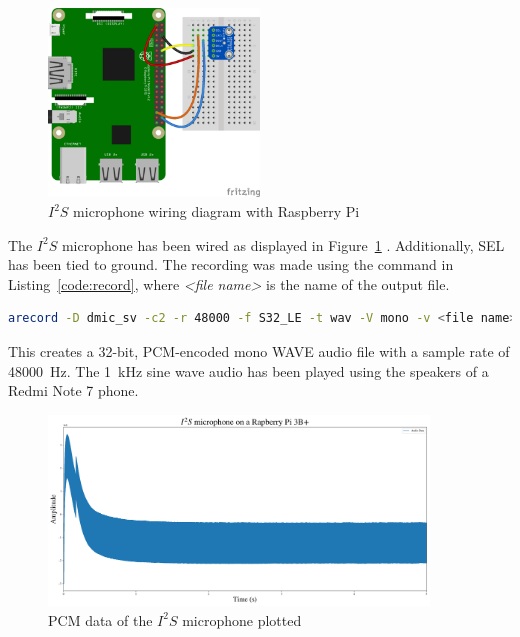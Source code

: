 \begin{figure}[H]
    \centering
    \includegraphics[width=0.5\textwidth]{figures/i2s/wiring_pi.png}
    \caption[$I^2S$ microphone wiring diagram with Raspberry Pi \cite{i2s_wiring}]{$I^2S$ microphone wiring diagram with Raspberry Pi}
    \label{fig:i2s_wiring}
\end{figure}

The $I^2S$ microphone has been wired as displayed in Figure~\ref{fig:i2s_wiring} \cite{i2s_wiring}.
Additionally, SEL has been tied to ground.
The recording was made using the command in Listing~\ref{code:record},
where \emph{<file name>} is the name of the output file.

\begin{minipage}{\textwidth}
\begin{lstlisting}[style=colorEX,language=bash,caption={Recording Command},label={code:record}]
arecord -D dmic_sv -c2 -r 48000 -f S32_LE -t wav -V mono -v <file name>
\end{lstlisting}
\end{minipage}

This creates a 32-bit, PCM-encoded mono WAVE audio file with a sample rate of \SI{48000}{\hertz}.
The \SI{1}{\kilo\hertz} sine wave audio has been played using the speakers of a Redmi Note 7 phone.

\begin{figure}[H]
    \centering
    \includegraphics[width=0.9\textwidth]{figures/i2s/i2s_raw_data.png}
    \caption[PCM data of the $I^2S$ microphone plotted]{PCM data of the $I^2S$ microphone plotted}
    \label{fig:i2s_raw}
\end{figure}

